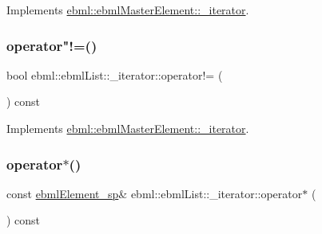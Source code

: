 Implements \mbox{\hyperlink{classebml_1_1ebmlMasterElement_1_1__iterator_af9f522b6d6f34acb410add9579a35c13}{ebml\+::ebml\+Master\+Element\+::\+\_\+iterator}}.

\mbox{\label{classebml_1_1ebmlList_1_1__iterator_af9980e46a983daefa5bd596e88047304}} 
\subsubsection{\texorpdfstring{operator"!=()}{operator!=()}}
{\footnotesize\ttfamily bool ebml\+::ebml\+List\+::\+\_\+iterator\+::operator!= (\begin{DoxyParamCaption}\item[{const \mbox{\hyperlink{classebml_1_1ebmlMasterElement_1_1__iterator}{ebml\+Master\+Element\+::\+\_\+iterator}} \&}]{ }\end{DoxyParamCaption}) const\hspace{0.3cm}{\ttfamily [virtual]}}



Implements \mbox{\hyperlink{classebml_1_1ebmlMasterElement_1_1__iterator_aef9e45972d70a546942f9de73af40dc2}{ebml\+::ebml\+Master\+Element\+::\+\_\+iterator}}.

\mbox{\label{classebml_1_1ebmlList_1_1__iterator_a2fc500e854171e07d1b0e3ca9ea48fb0}} 
\subsubsection{\texorpdfstring{operator$\ast$()}{operator*()}}
{\footnotesize\ttfamily const \mbox{\hyperlink{namespaceebml_adad533b7705a16bb360fe56380c5e7be}{ebml\+Element\+\_\+sp}}\& ebml\+::ebml\+List\+::\+\_\+iterator\+::operator$\ast$ (\begin{DoxyParamCaption}{ }\end{DoxyParamCaption}) const\hspace{0.3cm}{\ttfamily [virtual]}}



